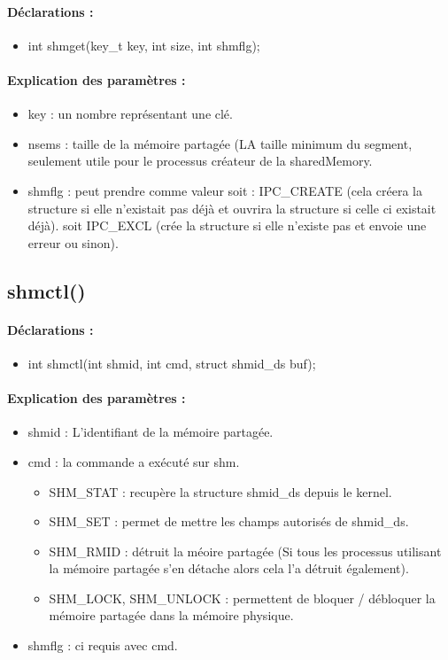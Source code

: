 \documentclass{article}[12pt]
\begin{document}
\paragraph{Déclarations : }
\begin{itemize}
	\item int shmget(key\_t key, int size, int shmflg);
\end{itemize}
\paragraph{Explication des paramètres : }
\begin{itemize}
\item key : un nombre représentant une clé.
\item nsems : taille de la mémoire partagée (LA taille minimum du segment, seulement utile pour le processus créateur de la sharedMemory. 
\item shmflg :  peut prendre comme valeur soit : IPC\_CREATE (cela créera la structure si elle n'existait pas déjà et ouvrira la structure si celle ci existait déjà). soit IPC\_EXCL (crée la structure si elle n'existe pas et envoie une erreur ou sinon).   
\end{itemize}
\subsection{shmctl()}
\paragraph{Déclarations : }
\begin{itemize}
	\item int shmctl(int shmid, int cmd, struct shmid\_ds \*buf);
\end{itemize}
\paragraph{Explication des paramètres : }
\begin{itemize}
\item shmid : L'identifiant de la mémoire partagée. 
\item cmd : la commande a exécuté sur shm. 
\begin{itemize}
	\item SHM\_STAT : recupère la structure shmid\_ds depuis le kernel.
    \item SHM\_SET : permet de mettre les champs autorisés de shmid\_ds.
    \item SHM\_RMID : détruit la méoire partagée (Si tous les processus utilisant la mémoire partagée s'en détache alors cela l'a détruit également).
    \item SHM\_LOCK, SHM\_UNLOCK : permettent de bloquer / débloquer la mémoire partagée dans la mémoire physique.
\end{itemize}
\item shmflg : ci requis avec cmd.   
\end{itemize}
\end{document}
